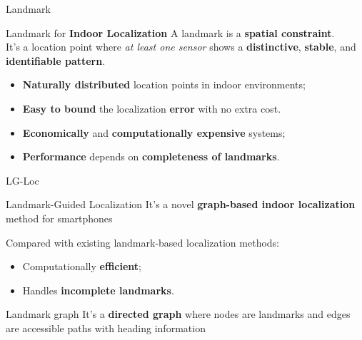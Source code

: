 \begin{frame}{Landmark}
    \begin{block}{Landmark for \textbf{Indoor Localization}}
        A landmark is a \textbf{spatial constraint}.\\
        It's a location point where \textit{at least one sensor} shows a \textbf{distinctive}, \textbf{stable}, and \textbf{identifiable pattern}.
    \end{block}
    
    \begin{itemize}
        \item \textbf{Naturally distributed} location points in indoor environments;
        \item \textbf{Easy to bound} the localization \textbf{error} with no extra cost.
    \end{itemize}
    
    \begin{itemize}
        \item \textbf{Economically} and \textbf{computationally expensive} systems;
        \item \textbf{Performance} depends on \textbf{completeness of landmarks}.
    \end{itemize}
    
\end{frame}

\begin{frame}{LG-Loc}
    \begin{block}{Landmark-Guided Localization}
        It's a novel \textbf{graph-based indoor localization} method for smartphones
    \end{block}

    Compared with existing landmark-based localization methods:
    \begin{itemize}
        \item Computationally \textbf{efficient};
        \item Handles \textbf{incomplete landmarks}.
    \end{itemize}

    \begin{block}{Landmark graph}
        It's a \textbf{directed graph} where nodes are landmarks and edges are accessible paths with heading information
    \end{block}
\end{frame}

